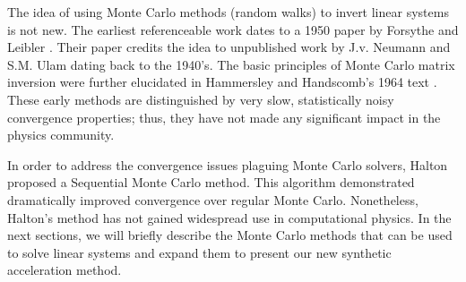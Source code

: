 \documentclass[preprint,12pt]{elsarticle}
\begin{document}
The idea of using Monte Carlo methods (random walks) to invert linear
systems is not new.  The earliest referenceable work dates to a 1950
paper by Forsythe and Leibler \cite{forsythe}.  Their paper credits
the idea to unpublished work by J.v. Neumann and S.M. Ulam dating back
to the 1940's.  The basic principles of Monte Carlo matrix inversion
were further elucidated in Hammersley and Handscomb's 1964 text
\cite{hammersley_1964}.  These early methods are distinguished by very
slow, statistically noisy convergence properties; thus, they have not
made any significant impact in the physics community.

In order to address the convergence issues plaguing Monte Carlo
solvers, Halton \cite{halton_1962,halton_1994} proposed a Sequential
Monte Carlo method.  This algorithm demonstrated dramatically improved
convergence over regular Monte Carlo.  Nonetheless, Halton's method
has not gained widespread use in computational physics.  In the next
sections, we will briefly describe the Monte Carlo methods that can be
used to solve linear systems and expand them to present our new
synthetic acceleration method.

\end{document}
